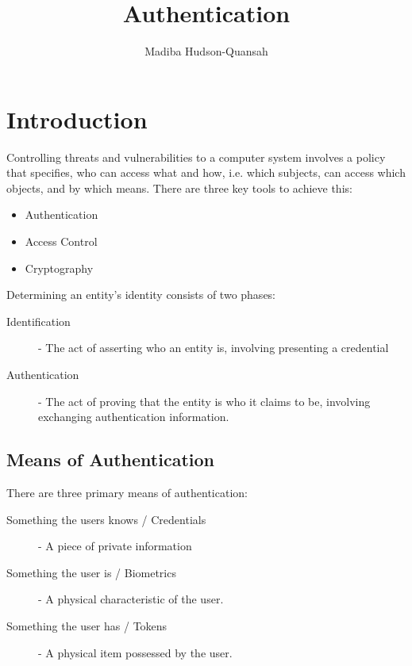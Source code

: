 \documentclass[12pt letter]{report}
\title{\Huge{Authentication}}
\author{\huge{Madiba Hudson-Quansah}}
\date{}
\begin{document}
\maketitle
\newpage
{}
\tableofcontents
\pagebreak

\chapter{Introduction}

Controlling threats and vulnerabilities to a computer system involves
a policy that specifies, who can access what and how, i.e. which
subjects, can access which objects, and by which means. There are
three key tools to achieve this:
\begin{itemize}
  \item Authentication
  \item Access Control
  \item Cryptography
\end{itemize}




Determining an entity's identity consists of two phases:
\begin{description}
  \item[Identification] - The act of asserting who an entity is,
    involving presenting a credential
  \item[Authentication] - The act of proving that the entity is who
    it claims to be, involving exchanging authentication information.
\end{description}

\section{Means of Authentication}
There are three primary means of authentication:
\begin{description}
  \item[Something the users knows / Credentials]  - A piece of
    private information
  \item[Something the user is / Biometrics] - A physical
    characteristic of the user.
  \item[Something the user has / Tokens] - A physical item possessed
    by the user.
\end{description}
\end{document}
